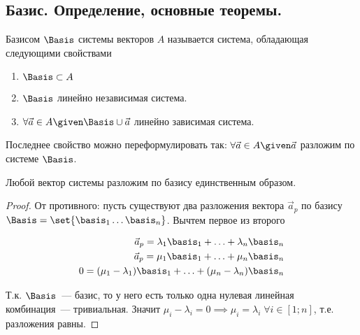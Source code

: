 \subsection{%
  Базис. Определение, основные теоремы.%
} \label{sec:01-10}

\begin{definition}
  Базисом \(\Basis\) системы векторов \(A\) называется система, обладающая
  следующими свойствами
  
  \begin{enumerate}
  \item
    \(\Basis \subset A\)
    
  \item
    \(\Basis\) линейно независимая система.
    
  \item
    \(\forall \vec{a} \in A \given \Basis \cup \vec{a}\) линейно зависимая
    система.
  \end{enumerate}
\end{definition}

\begin{remark}
  Последнее свойство можно переформулировать так: \(\forall \vec{a} \in A \given
  \vec{a}\) разложим по системе \(\Basis\).
\end{remark}

\begin{theorem}
  Любой вектор системы разложим по базису единственным образом.
\end{theorem}

\begin{proof}
  От противного: пусть существуют два разложения вектора \(\vec{a}_p\) по базису
  \(\Basis = \set{\basis_1 \dotsc \basis_n}\). Вычтем первое из второго
  
  \begin{equation*}
    \begin{aligned}
      \vec{a}_p = \lambda_1 \basis_1 + \dotsc + \lambda_n \basis_n
    \\
      \vec{a}_p = \mu_1 \basis_1 + \dotsc + \mu_n \basis_n
    \\
      0 = (\mu_1 - \lambda_1) \basis_1 + \dotsc + (\mu_n - \lambda_n) \basis_n  
    \end{aligned}
  \end{equation*}
  
  Т.к. \(\Basis\)~--- базис, то у него есть только одна нулевая линейная
  комбинация~--- тривиальная. Значит \(\mu_i - \lambda_i = 0 \implies \mu_i =
  \lambda_i \; \forall i \in [1; n]\), т.е. разложения равны.
\end{proof}

